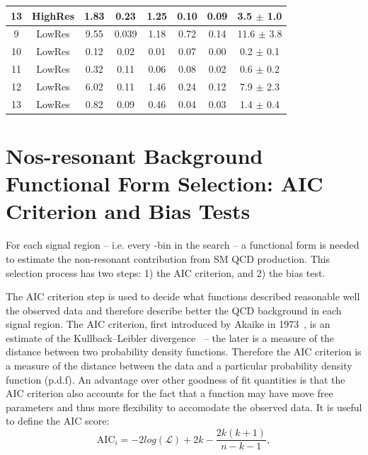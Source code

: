 \begin{table}[htb]
\begin{center}
\begin{tabular}{|c|c|c|c|c|c|c|c|}
13 & HighRes & 1.83  & 0.23   & 1.25   & 0.10   & 0.09    & 3.5 $\pm$ 1.0    \\    
\hline                                                                     
9  & LowRes & 9.55   & 0.039  & 1.18   & 0.72   & 0.14    & 11.6 $\pm$ 3.8   \\
10 & LowRes & 0.12   & 0.02   & 0.01   & 0.07   & 0.00    & 0.2 $\pm$ 0.1    \\
11 & LowRes & 0.32   & 0.11   & 0.06   & 0.08   & 0.02    & 0.6 $\pm$ 0.2    \\
12 & LowRes & 6.02   & 0.11   & 1.46   & 0.24   & 0.12    & 7.9 $\pm$ 2.3    \\
13 & LowRes & 0.82   & 0.09   & 0.46   & 0.04   & 0.03    & 1.4 $\pm$ 0.4    \\
\hline
\end{tabular}
\end{center}
\end{table}



\section{Nos-resonant Background Functional Form Selection: AIC
  Criterion and Bias Tests}
For each signal region -- i.e. every \MR-\Rtwo bin in the search -- a functional form is needed to estimate the non-resonant
contribution from SM QCD  production. This selection process has two
steps: 1) the AIC criterion, and 2) the bias test.

The AIC criterion step is used to decide what functions described
reasonable well the observed data and therefore describe better the
QCD background in each signal region. The AIC criterion, first
introduced by Akaike in 1973~\cite{AIC}, is an estimate of the
Kullback–Leibler divergence~\cite{kullback1951} -- the later is a measure of
the distance between two probability density functions. Therefore the
AIC criterion is a measure of the distance between the data and a
particular probability density function (p.d.f). An advantage over
other goodness of fit quantities is that the AIC criterion also
accounts for the fact that a function may have move free parameters
and thus more flexibility to accomodate the observed data. It is
useful to define the AIC score:
\begin{equation}
\label{eq:AIC}
\mathrm{AIC}_{i} = -2log(\mathcal{L}) + 2k -\frac{2k(k+1)}{n-k-1},
\end{equation}

